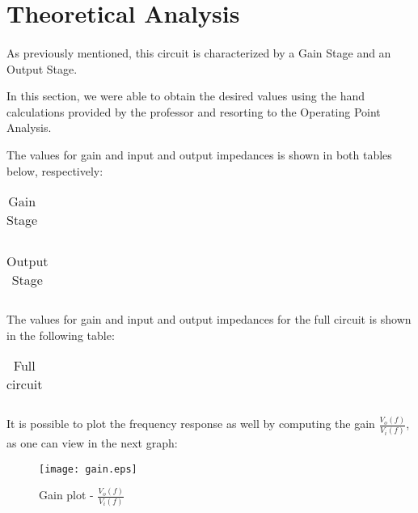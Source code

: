 \section{Theoretical Analysis}
\label{sec:analysis}
\paragraph{}

\par As previously mentioned, this circuit is characterized by a Gain Stage and an Output Stage.
\par In this section, we were able to obtain the desired values using the hand calculations provided by the professor and resorting to the Operating Point Analysis.
\par The values for gain and input and output impedances is shown in both tables below, respectively:

\begin{table}[H]
    \centering
    \begin{tabular}{|c|c|}
    \hline
        
    \end{tabular}
    \caption{Gain Stage}
    \label{table4a}
\end{table}

\begin{table}[H]
    \centering
    \begin{tabular}{|c|c|}
    \hline
        
    \end{tabular}
    \caption{Output Stage}
    \label{table4a}
\end{table}

\par The values for gain and input and output impedances for the full circuit is shown in the following table:

\begin{table}[H]
    \centering
    \begin{tabular}{|c|c|}
    \hline
        
    \end{tabular}
    \caption{Full circuit}
    \label{table4a}
\end{table}



\par It is possible to plot the frequency response as well by computing the gain $\frac{V_o(f)}{V_i(f)}$, as one can view in the next graph:

\begin{figure}[H]
	\texttt{[image: gain.eps]}
	\centering
	\caption{Gain plot - $\frac{V_o(f)}{V_i(f)}$}
	\label{pha}
\end{figure}


